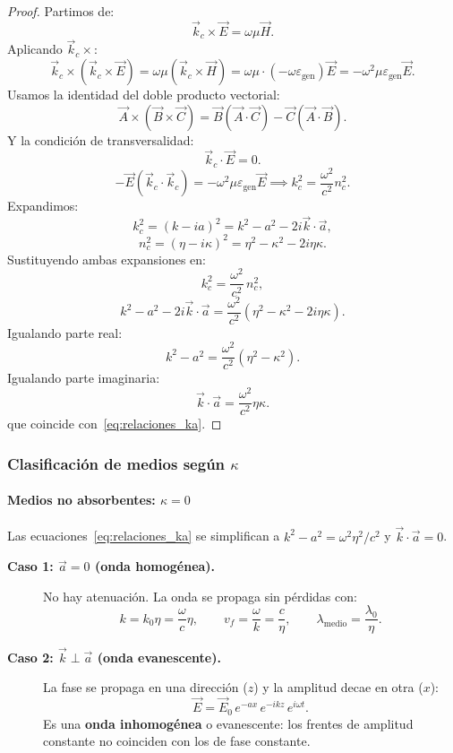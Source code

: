 \documentclass[12pt, a4paper]{article}
\theoremstyle{plain}
\theoremstyle{definition}
\theoremstyle{remark}
\newcommand{\ve}[1]{\vec{#1}}
\begin{document}
\begin{proof}
Partimos de:
\[
  \ve{k}_c\times\ve{E}=\omega\mu\ve{H}.
\]
Aplicando $\ve{k}_c\times$:
\[
  \ve{k}_c\times(\ve{k}_c\times\ve{E})
  = \omega\mu(\ve{k}_c\times\ve{H})
  = \omega\mu\cdot(-\omega\varepsilon_\text{gen})\ve{E}
  = -\omega^2\mu\varepsilon_\text{gen}\ve{E}.
\]
Usamos la identidad del doble producto vectorial:
\[
  \ve{A}\times(\ve{B}\times\ve{C})
  = \ve{B}(\ve{A}\cdot\ve{C})-\ve{C}(\ve{A}\cdot\ve{B}).
\]
Y la condición de transversalidad:
\[
  \ve{k}_c\cdot\ve{E}=0.
\]
\[
  -\ve{E}(\ve{k}_c\cdot\ve{k}_c) = -\omega^2\mu\varepsilon_\text{gen}\ve{E}
  \implies k_c^2 = \frac{\omega^2}{c^2}n_c^2.
\]
Expandimos:
\[
  k_c^2 = (k-ia)^2 = k^2-a^2-2i\ve{k}\cdot\ve{a},
\]
\[
  n_c^2=(\eta-i\kappa)^2=\eta^2-\kappa^2-2i\eta\kappa.
\]
Sustituyendo ambas expansiones en:
\[
  k_c^2=\frac{\omega^2}{c^2}\,n_c^2,
\]
\[
  k^2-a^2-2i\ve{k}\cdot\ve{a}
  =
  \frac{\omega^2}{c^2}\left(\eta^2-\kappa^2-2i\eta\kappa\right).
\]
Igualando parte real:
\[
  k^2-a^2=\frac{\omega^2}{c^2}(\eta^2-\kappa^2).
\]
Igualando parte imaginaria:
\[
  \ve{k}\cdot\ve{a}=\frac{\omega^2}{c^2}\eta\kappa.
\]
que coincide con~\eqref{eq:relaciones_ka}.
\end{proof}

\subsubsection{Clasificación de medios según \texorpdfstring{$\kappa$}{kappa}}

\paragraph{Medios no absorbentes: $\kappa = 0$}

Las ecuaciones~\eqref{eq:relaciones_ka} se simplifican a
$k^2 - a^2 = \omega^2\eta^2/c^2$ y $\ve{k}\cdot\ve{a}=0$.

\begin{description}
  \item[\textbf{Caso 1: $\ve{a}=0$ (onda homogénea).}]
        No hay atenuación. La onda se propaga sin pérdidas con:
        \begin{equation}
          k = k_0\eta = \frac{\omega}{c}\eta, \qquad
          v_f = \frac{\omega}{k} = \frac{c}{\eta}, \qquad
          \lambda_\text{medio} = \frac{\lambda_0}{\eta}. \label{eq:homogenea}
        \end{equation}

  \item[\textbf{Caso 2: $\ve{k}\perp\ve{a}$ (onda evanescente).}]
        La fase se propaga en una dirección ($z$) y la amplitud decae en
        otra ($x$):
        \[
          \ve{E} = \ve{E}_0\,e^{-ax}\,e^{-ikz}\,e^{i\omega t}.
        \]
        Es una \textbf{onda inhomogénea} o evanescente: los frentes de
        amplitud constante no coinciden con los de fase constante.
\end{description}
\end{document}
